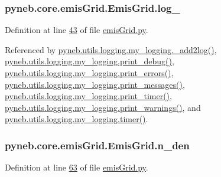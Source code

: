 \hypertarget{classpyneb_1_1core_1_1emis_grid_1_1_emis_grid_a1a53003d1e4a12bbc4ff9233a3fcd54a}{
\subsubsection[{log\-\_\-}]{\setlength{\rightskip}{0pt plus 5cm}pyneb.\-core.\-emis\-Grid.\-Emis\-Grid.\-log\-\_\-}}\label{classpyneb_1_1core_1_1emis_grid_1_1_emis_grid_a1a53003d1e4a12bbc4ff9233a3fcd54a}


Definition at line \hyperlink{emis_grid_8py_source_l00043}{43} of file \hyperlink{emis_grid_8py_source}{emis\-Grid.\-py}.



Referenced by \hyperlink{logging_8py_source_l00059}{pyneb.\-utils.\-logging.\-my\-\_\-logging.\-\_\-add2log()}, \hyperlink{logging_8py_source_l00157}{pyneb.\-utils.\-logging.\-my\-\_\-logging.\-print\-\_\-debug()}, \hyperlink{logging_8py_source_l00149}{pyneb.\-utils.\-logging.\-my\-\_\-logging.\-print\-\_\-errors()}, \hyperlink{logging_8py_source_l00133}{pyneb.\-utils.\-logging.\-my\-\_\-logging.\-print\-\_\-messages()}, \hyperlink{logging_8py_source_l00165}{pyneb.\-utils.\-logging.\-my\-\_\-logging.\-print\-\_\-timer()}, \hyperlink{logging_8py_source_l00141}{pyneb.\-utils.\-logging.\-my\-\_\-logging.\-print\-\_\-warnings()}, and \hyperlink{logging_8py_source_l00115}{pyneb.\-utils.\-logging.\-my\-\_\-logging.\-timer()}.

\hypertarget{classpyneb_1_1core_1_1emis_grid_1_1_emis_grid_a6e0bddbe2d14b13fe1270a74b5b9ac0c}{
\subsubsection[{n\-\_\-den}]{\setlength{\rightskip}{0pt plus 5cm}pyneb.\-core.\-emis\-Grid.\-Emis\-Grid.\-n\-\_\-den}}\label{classpyneb_1_1core_1_1emis_grid_1_1_emis_grid_a6e0bddbe2d14b13fe1270a74b5b9ac0c}


Definition at line \hyperlink{emis_grid_8py_source_l00063}{63} of file \hyperlink{emis_grid_8py_source}{emis\-Grid.\-py}.

